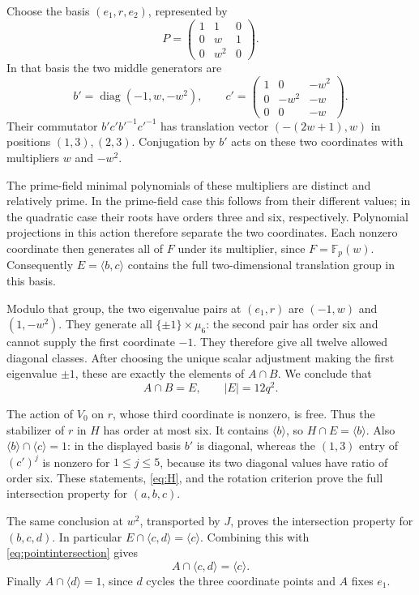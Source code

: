 \documentclass[11pt,a4paper]{article}
\newcommand{\Fp}{\mathbb F_p}\newcommand{\PG}{\operatorname{PG}}
\begin{document}
Choose the basis $(e_1,r,e_2)$, represented by
\[
 P=\begin{pmatrix}1&1&0\\0&w&1\\0&w^2&0\end{pmatrix}.
\]
In that basis the two middle generators are
\[
 b'=\operatorname{diag}(-1,w,-w^2),\qquad
 c'=\begin{pmatrix}1&0&-w^2\\0&-w^2&-w\\0&0&-w\end{pmatrix}.
\]
Their commutator $b'c'b'^{-1}c'^{-1}$ has translation vector
$(-(2w+1),w)$ in positions $(1,3),(2,3)$. Conjugation by $b'$ acts
on these two coordinates with multipliers $w$ and $-w^2$.

The prime-field minimal polynomials of these multipliers are distinct
and relatively prime. In the prime-field case this follows from their
different values; in the quadratic case their roots have orders three
and six, respectively. Polynomial projections in this action therefore
separate the two coordinates. Each nonzero coordinate then generates
all of $F$ under its multiplier, since $F=\Fp(w)$. Consequently
$E=\langle b,c\rangle$ contains the full two-dimensional translation
group in this basis.

Modulo that group, the two eigenvalue pairs at $(e_1,r)$ are
$(-1,w)$ and $(1,-w^2)$. They generate all
$\{\pm1\}\times\mu_6$: the second pair has order six and cannot
supply the first coordinate $-1$. They therefore give all twelve
allowed diagonal classes. After choosing the unique scalar adjustment
making the first eigenvalue $\pm1$, these are exactly the elements
of $A\cap B$. We conclude that
\begin{equation}\label{eq:pointintersection}
                      A\cap B=E,\qquad |E|=12q^2.
\end{equation}

The action of $V_0$ on $r$, whose third coordinate is nonzero, is free.
Thus the stabilizer of $r$ in $H$ has order at most six. It contains
$\langle b\rangle$, so $H\cap E=\langle b\rangle$.
Also $\langle b\rangle\cap\langle c\rangle=1$: in the displayed
basis $b'$ is diagonal, whereas the $(1,3)$ entry of $(c')^j$ is nonzero
for $1\leq j\leq5$, because its two diagonal values have ratio of
order six. These statements, \eqref{eq:H}, and the rotation criterion
prove the full intersection property for $(a,b,c)$.

The same conclusion at $w^2$, transported by $J$, proves the
intersection property for $(b,c,d)$. In particular
$E\cap\langle c,d\rangle=\langle c\rangle$. Combining this with
\eqref{eq:pointintersection} gives
\[
             A\cap\langle c,d\rangle=\langle c\rangle.
\]
Finally $A\cap\langle d\rangle=1$, since $d$ cycles the three
coordinate points and $A$ fixes $e_1$.
\end{document}
